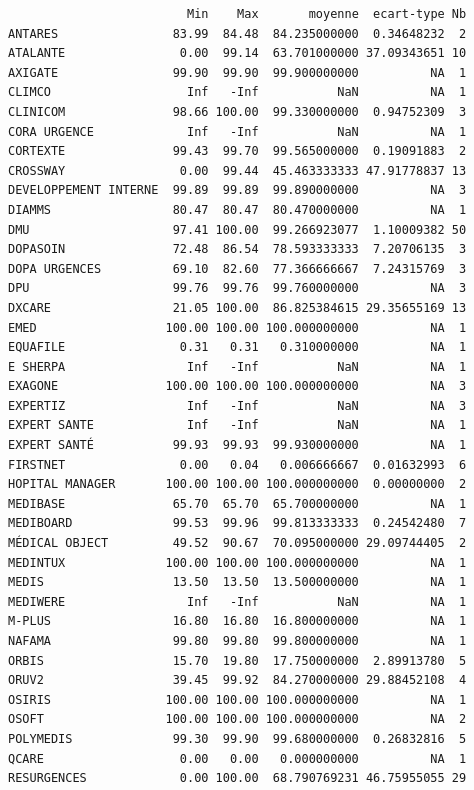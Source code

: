 \documentclass[]{article}
\begin{document}
\begin{verbatim}
                         Min    Max       moyenne  ecart-type Nb
ANTARES                83.99  84.48  84.235000000  0.34648232  2
ATALANTE                0.00  99.14  63.701000000 37.09343651 10
AXIGATE                99.90  99.90  99.900000000          NA  1
CLIMCO                   Inf   -Inf           NaN          NA  1
CLINICOM               98.66 100.00  99.330000000  0.94752309  3
CORA URGENCE             Inf   -Inf           NaN          NA  1
CORTEXTE               99.43  99.70  99.565000000  0.19091883  2
CROSSWAY                0.00  99.44  45.463333333 47.91778837 13
DEVELOPPEMENT INTERNE  99.89  99.89  99.890000000          NA  3
DIAMMS                 80.47  80.47  80.470000000          NA  1
DMU                    97.41 100.00  99.266923077  1.10009382 50
DOPASOIN               72.48  86.54  78.593333333  7.20706135  3
DOPA URGENCES          69.10  82.60  77.366666667  7.24315769  3
DPU                    99.76  99.76  99.760000000          NA  3
DXCARE                 21.05 100.00  86.825384615 29.35655169 13
EMED                  100.00 100.00 100.000000000          NA  1
EQUAFILE                0.31   0.31   0.310000000          NA  1
E SHERPA                 Inf   -Inf           NaN          NA  1
EXAGONE               100.00 100.00 100.000000000          NA  3
EXPERTIZ                 Inf   -Inf           NaN          NA  3
EXPERT SANTE             Inf   -Inf           NaN          NA  1
EXPERT SANTÉ           99.93  99.93  99.930000000          NA  1
FIRSTNET                0.00   0.04   0.006666667  0.01632993  6
HOPITAL MANAGER       100.00 100.00 100.000000000  0.00000000  2
MEDIBASE               65.70  65.70  65.700000000          NA  1
MEDIBOARD              99.53  99.96  99.813333333  0.24542480  7
MÉDICAL OBJECT         49.52  90.67  70.095000000 29.09744405  2
MEDINTUX              100.00 100.00 100.000000000          NA  1
MEDIS                  13.50  13.50  13.500000000          NA  1
MEDIWERE                 Inf   -Inf           NaN          NA  1
M-PLUS                 16.80  16.80  16.800000000          NA  1
NAFAMA                 99.80  99.80  99.800000000          NA  1
ORBIS                  15.70  19.80  17.750000000  2.89913780  5
ORUV2                  39.45  99.92  84.270000000 29.88452108  4
OSIRIS                100.00 100.00 100.000000000          NA  1
OSOFT                 100.00 100.00 100.000000000          NA  2
POLYMEDIS              99.30  99.90  99.680000000  0.26832816  5
QCARE                   0.00   0.00   0.000000000          NA  1
RESURGENCES             0.00 100.00  68.790769231 46.75955055 29

\end{verbatim}
\end{document}
